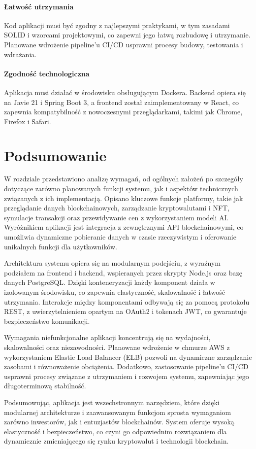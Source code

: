 \paragraph{Łatwość utrzymania}
Kod aplikacji musi być zgodny z najlepszymi praktykami, w tym zasadami SOLID i wzorcami projektowymi, co zapewni jego łatwą rozbudowę i utrzymanie. Planowane wdrożenie pipeline'u CI/CD usprawni procesy budowy, testowania i wdrażania.

\paragraph{Zgodność technologiczna}
Aplikacja musi działać w środowisku obsługującym Dockera. Backend opiera się na Javie 21 i Spring Boot 3, a frontend został zaimplementowany w React, co zapewnia kompatybilność z nowoczesnymi przeglądarkami, takimi jak Chrome, Firefox i Safari.


\section{Podsumowanie}

W rozdziale przedstawiono analizę wymagań, od ogólnych założeń po szczegóły dotyczące zarówno planowanych funkcji systemu, jak i aspektów technicznych związanych z ich implementacją. Opisano kluczowe funkcje platformy, takie jak przeglądanie danych blockchainowych, zarządzanie kryptowalutami i NFT, symulacje transakcji oraz przewidywanie cen z wykorzystaniem modeli AI. Wyróżnikiem aplikacji jest integracja z zewnętrznymi API blockchainowymi, co umożliwia dynamiczne pobieranie danych w czasie rzeczywistym i oferowanie unikalnych funkcji dla użytkowników.

Architektura systemu opiera się na modularnym podejściu, z wyraźnym podziałem na frontend i backend, wspieranych przez skrypty Node.js oraz bazę danych PostgreSQL. Dzięki konteneryzacji każdy komponent działa w izolowanym środowisku, co zapewnia elastyczność, skalowalność i łatwość utrzymania. Interakcje między komponentami odbywają się za pomocą protokołu REST, z uwierzytelnieniem opartym na OAuth2 i tokenach JWT, co gwarantuje bezpieczeństwo komunikacji.

Wymagania niefunkcjonalne aplikacji koncentrują się na wydajności, skalowalności oraz niezawodności. Planowane wdrożenie w chmurze AWS z wykorzystaniem Elastic Load Balancer (ELB) pozwoli na dynamiczne zarządzanie zasobami i równoważenie obciążenia. Dodatkowo, zastosowanie pipeline’u CI/CD usprawni procesy związane z utrzymaniem i rozwojem systemu, zapewniając jego długoterminową stabilność.

Podsumowując, aplikacja jest wszechstronnym narzędziem, które dzięki modularnej architekturze i zaawansowanym funkcjom sprosta wymaganiom zarówno inwestorów, jak i entuzjastów blockchainów. System oferuje wysoką elastyczność i bezpieczeństwo, co czyni go odpowiednim rozwiązaniem dla dynamicznie zmieniającego się rynku kryptowalut i technologii blockchain.

